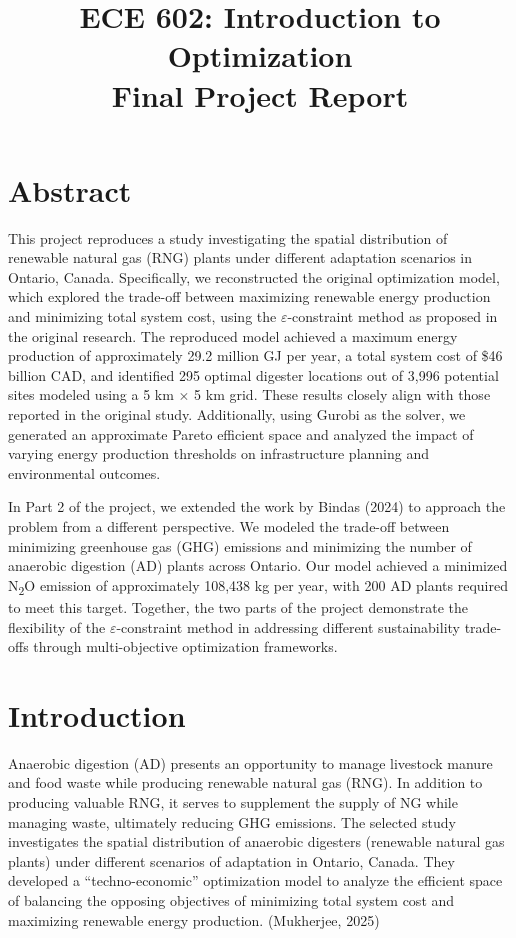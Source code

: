 \documentclass[12pt]{article}
\title{\textbf{ECE 602: Introduction to Optimization} \\ Final Project Report}
\date{}
\begin{document}
\maketitle

\section*{Abstract}
This project reproduces a study investigating the spatial distribution of renewable natural gas (RNG) plants under different adaptation scenarios in Ontario, Canada. Specifically, we reconstructed the original optimization model, which explored the trade-off between maximizing renewable energy production and minimizing total system cost, using the $\varepsilon$-constraint method as proposed in the original research. The reproduced model achieved a maximum energy production of approximately 29.2 million GJ per year, a total system cost of \$46 billion CAD, and identified 295 optimal digester locations out of 3,996 potential sites modeled using a 5 km $\times$ 5 km grid. These results closely align with those reported in the original study. Additionally, using Gurobi as the solver, we generated an approximate Pareto efficient space and analyzed the impact of varying energy production thresholds on infrastructure planning and environmental outcomes.

In Part 2 of the project, we extended the work by Bindas (2024) to approach the problem from a different perspective. We modeled the trade-off between minimizing greenhouse gas (GHG) emissions and minimizing the number of anaerobic digestion (AD) plants across Ontario. Our model achieved a minimized N\textsubscript{2}O emission of approximately 108,438 kg per year, with 200 AD plants required to meet this target. Together, the two parts of the project demonstrate the flexibility of the $\varepsilon$-constraint method in addressing different sustainability trade-offs through multi-objective optimization frameworks.


\section{Introduction}
Anaerobic digestion (AD) presents an opportunity to manage livestock manure and food waste while producing renewable natural gas (RNG). In addition to producing valuable RNG, it serves to supplement the supply of NG while managing waste, ultimately reducing GHG emissions. 
The selected study investigates the spatial distribution of anaerobic digesters (renewable natural gas plants) under different scenarios of adaptation in Ontario, Canada. They developed a “techno-economic” optimization model to analyze the efficient space of balancing the opposing objectives of minimizing total system cost and maximizing renewable energy production. (Mukherjee, 2025) 
\end{document}
